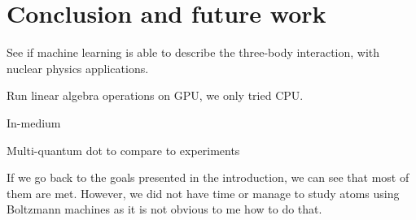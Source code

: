 \chapter{Conclusion and future work} \label{sec:conclusion}
See if machine learning is able to describe the three-body interaction, with nuclear physics applications. 

Run linear algebra operations on GPU, we only tried CPU. 

In-medium

Multi-quantum dot to compare to experiments

If we go back to the goals presented in the introduction, we can see that most of them are met. However, we did not have time or manage to study atoms using Boltzmann machines as it is not obvious to me how to do that. 